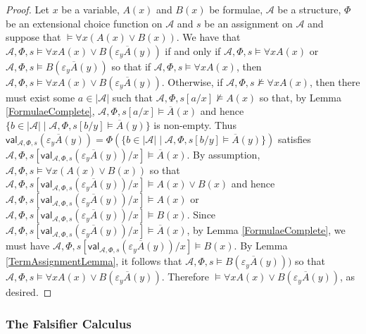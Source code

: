 \documentclass[10pt]{article}
\theoremstyle{definition}\newtheorem{remark}[theorem]{Remark}
\theoremstyle{definition}\newtheorem{example}[theorem]{Example}
\theoremstyle{definition}\newtheorem{definition}[theorem]{Definition}
\begin{document}
	\begin{proof}
		Let $x$ be a variable, $A(x)$ and $B(x)$ be formulae, $\mathcal{A}$ be a structure, $\Phi$ be an extensional choice function on $\mathcal{A}$ and $s$ be an assignment on $\mathcal{A}$ and suppose that $\models \forall x (A(x) \lor B(x))$. We have that $\mathcal{A}, \Phi, s \models \forall x A(x) \lor B(\varepsilon_y \overline{A}(y))$ if and only if $\mathcal{A}, \Phi, s \models \forall x A(x)$ or $\mathcal{A}, \Phi, s \models B(\varepsilon_y \overline{A}(y))$ so that if $\mathcal{A}, \Phi, s \models \forall x A(x)$, then $\mathcal{A}, \Phi, s \models \forall x A(x) \lor B(\varepsilon_y \overline{A}(y))$. Otherwise, if $\mathcal{A}, \Phi, s \nvDash \forall x A(x)$, then there must exist some $a \in | \mathcal{A} |$ such that $\mathcal{A}, \Phi, s[a / x] \nvDash A(x)$ so that, by Lemma \ref{FormulaeComplete}, $\mathcal{A}, \Phi, s[a / x] \models \overline{A}(x)$ and hence $\{b \in | \mathcal{A} | \mid \mathcal{A}, \Phi, s[b / y] \models \overline{A}(y)\}$ is non-empty. Thus $\mathsf{val}_{\mathcal{A}, \Phi, s}(\varepsilon_y \overline{A}(y)) = \Phi(\{b \in | \mathcal{A} | \mid \mathcal{A}, \Phi, s[b / y] \models \overline{A}(y)\})$ satisfies $\mathcal{A}, \Phi, s[\mathsf{val}_{\mathcal{A}, \Phi, s}(\varepsilon_y \overline{A}(y)) / x] \models \overline{A}(x)$. By assumption, $\mathcal{A}, \Phi, s \models \forall x (A(x) \lor B(x))$ so that $\mathcal{A}, \Phi, s[\mathsf{val}_{\mathcal{A}, \Phi, s}(\varepsilon_y \overline{A}(y)) / x] \models A(x) \lor B(x)$ and hence $\mathcal{A}, \Phi, s[\mathsf{val}_{\mathcal{A}, \Phi, s}(\varepsilon_y \overline{A}(y)) / x] \models A(x)$ or $\mathcal{A}, \Phi, s[\mathsf{val}_{\mathcal{A}, \Phi, s}(\varepsilon_y \overline{A}(y)) / x] \models B(x)$. Since $\mathcal{A}, \Phi, s[\mathsf{val}_{\mathcal{A}, \Phi, s}(\varepsilon_y \overline{A}(y)) / x] \models \overline{A}(x)$, by Lemma \ref{FormulaeComplete}, we must have $\mathcal{A}, \Phi, s[\mathsf{val}_{\mathcal{A}, \Phi, s}(\varepsilon_y \overline{A}(y)) / x] \models B(x)$. By Lemma \ref{TermAssignmentLemma}, it follows that $\mathcal{A}, \Phi, s \models B(\varepsilon_y \overline{A}(y)))$ so that $\mathcal{A}, \Phi, s \models \forall x A(x) \lor B(\varepsilon_y \overline{A}(y))$. Therefore $\models \forall x A(x) \lor B(\varepsilon_y \overline{A}(y))$, as desired.
	\end{proof}

	\subsubsection*{The Falsifier Calculus}
	
\end{document}
